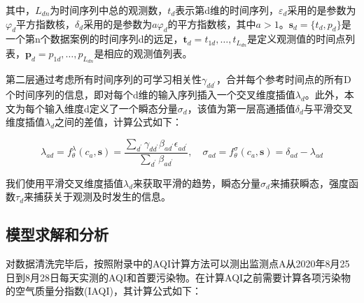 \documentclass[a4paper,10pt]{my_paper}
\numberwithin{equation}{section}
\begin{document}
其中，${L_{dn}}$为时间序列中总的观测数，${t_d}$表示第d维的时间序列，${\varepsilon_d}$采用的是参数为${\varphi_d}$平方指数核，${\delta_d}$采用的是参数为${a\varphi_d}$的平方指数核，其中${a>1}$。${\textbf{s}_d=\{t_d,p_d\}}$是一个第n个数据案例的时间序列d的远足，${\textbf{t}_d={t_{1d},\dots,t_{L_{dn}}}}$是定义观测值的时间点列表，${\textbf{p}_d={p_{1d},\dots,p_{L_{dn}}}}$是相应的观测值列表。

第二层通过考虑所有时间序列的可学习相关性${\gamma_{dd^{'}}}$，合并每个参考时间点的所有D个时间序列的信息，即对每个d维的输入序列插入一个交叉维度插值${\lambda_d}$。此外，本文为每个输入维度d定义了一个瞬态分量${\sigma_d}$，该值为第一层高通插值${\delta_d}$与平滑交叉维度插值${\lambda_d}$之间的差值，计算公式如下：

\begin{equation}
  \lambda_{ad} = f_{\theta}^\lambda(c_a, \textbf{s}) = \frac{\sum_{d^{'}}\gamma_{dd^{'}}\beta_{ad^{'}}\epsilon_{ad^{'}}}{\sum_{d^{'}}\beta_{ad^{'}}}, \quad \sigma_{ad} = f_{\theta}^\sigma(c_a,\textbf{s}) = \delta_{ad}-\lambda _{ad} 
\end{equation}

我们使用平滑交叉维度插值${\lambda_d}$来获取平滑的趋势，瞬态分量${\sigma_d}$来捕获瞬态，强度函数${\tau_d}$来捕获关于观测及时发生的信息。







\subsection{模型求解和分析}
对数据清洗完毕后，按照附录中的AQI计算方法可以测出监测点A从2020年8月25日到8月28日每天实测的AQI和首要污染物。在计算AQI之前需要计算各项污染物的空气质量分指数(IAQI)，其计算公式如下：
\end{document}
